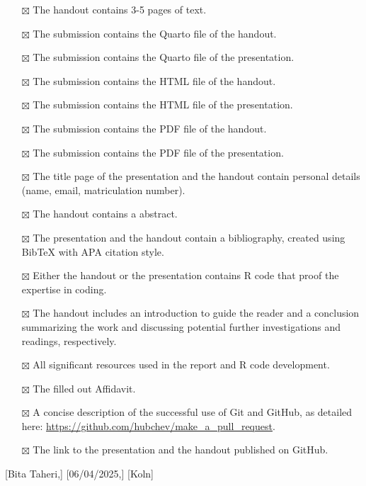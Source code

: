 \documentclass[
  man,
  floatsintext,
  longtable,
  nolmodern,
  notxfonts,
  notimes,
  colorlinks=true,linkcolor=blue,citecolor=blue,urlcolor=blue]{apa7}
\providecommand{\tightlist}{%
  \setlength{\itemsep}{0pt}\setlength{\parskip}{0pt}}
\begin{document}
\begin{itemize}
\tightlist
\item[$\boxtimes$]
  The handout contains 3-5 pages of text.
\item[$\boxtimes$]
  The submission contains the Quarto file of the handout.
\item[$\boxtimes$]
  The submission contains the Quarto file of the presentation.
\item[$\boxtimes$]
  The submission contains the HTML file of the handout.
\item[$\boxtimes$]
  The submission contains the HTML file of the presentation.
\item[$\boxtimes$]
  The submission contains the PDF file of the handout.
\item[$\boxtimes$]
  The submission contains the PDF file of the presentation.
\item[$\boxtimes$]
  The title page of the presentation and the handout contain personal
  details (name, email, matriculation number).
\item[$\boxtimes$]
  The handout contains a abstract.
\item[$\boxtimes$]
  The presentation and the handout contain a bibliography, created using
  BibTeX with APA citation style.
\item[$\boxtimes$]
  Either the handout or the presentation contains R code that proof the
  expertise in coding.
\item[$\boxtimes$]
  The handout includes an introduction to guide the reader and a
  conclusion summarizing the work and discussing potential further
  investigations and readings, respectively.
\item[$\boxtimes$]
  All significant resources used in the report and R code development.
\item[$\boxtimes$]
  The filled out Affidavit.
\item[$\boxtimes$]
  A concise description of the successful use of Git and GitHub, as
  detailed here: \url{https://github.com/hubchev/make_a_pull_request}.
\item[$\boxtimes$]
  The link to the presentation and the handout published on GitHub.
\end{itemize}

{[}Bita Taheri,{]} {[}06/04/2025,{]} {[}Koln{]}
\end{document}
